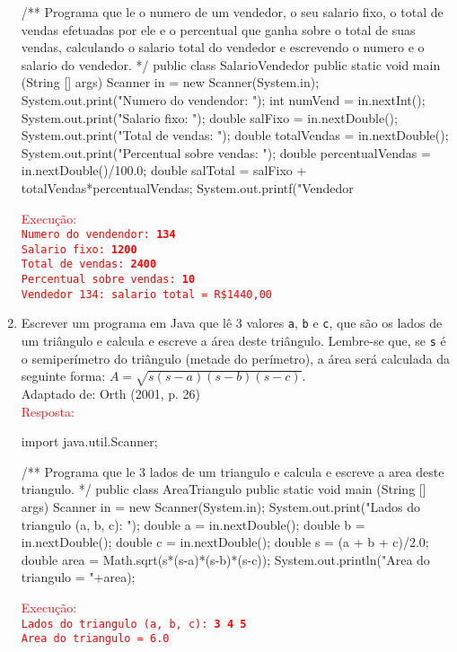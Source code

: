 \documentclass[onecolumn,a4paper,10pt]{report}
\newcommand{\+}{\, + \,}
\newcommand{\<}{\hspace*{-0.4cm}}
\begin{document}
\begin{enumerate}[1.]
\begin{javacode}
/**
   Programa que le o numero de um vendedor, o seu salario fixo, o total de
   vendas efetuadas por ele e o percentual que ganha sobre o total de suas
   vendas, calculando o salario total do vendedor e escrevendo o numero e o
   salario do vendedor.
*/
public class SalarioVendedor {
    public static void main (String [] args) {
        Scanner in = new Scanner(System.in);
        System.out.print("Numero do vendendor: ");
        int numVend = in.nextInt();
        System.out.print("Salario fixo: ");
        double salFixo = in.nextDouble();
        System.out.print("Total de vendas: ");
        double totalVendas = in.nextDouble();
        System.out.print("Percentual sobre vendas: ");
        double percentualVendas = in.nextDouble()/100.0;
        double salTotal = salFixo + totalVendas*percentualVendas;
        System.out.printf("Vendedor %
    }
}
\end{javacode}
\textcolor{red}{Execução:\\
\texttt{Numero do vendendor: \textbf{134}\\
Salario fixo: \textbf{1200}\\
Total de vendas: \textbf{2400}\\
Percentual sobre vendas: \textbf{10}\\
Vendedor 134: salario total = R\$1440,00}
}

\item Escrever um programa em Java que lê 3 valores \texttt{a}, \texttt{b} e \texttt{c}, que são os lados de um triângulo e calcula e escreve a área deste triângulo. Lembre-se que, se \texttt{s} é o semiperímetro do triângulo (metade do perímetro), a área será calculada da seguinte forma: $A = \sqrt{s(s-a)(s-b)(s-c)}$.\\
{\tiny Adaptado de: Orth (2001, p. 26)}\\
\textcolor{red}{Resposta:}\\
\begin{javacode}
import java.util.Scanner;

/**
   Programa que le 3 lados de um triangulo e calcula e escreve
   a area deste triangulo.
*/
public class AreaTriangulo {
    public static void main (String [] args) {
        Scanner in = new Scanner(System.in);
        System.out.print("Lados do triangulo (a, b, c): ");
        double a = in.nextDouble();
        double b = in.nextDouble();
        double c = in.nextDouble();
        double s = (a + b + c)/2.0;
        double area = Math.sqrt(s*(s-a)*(s-b)*(s-c));
        System.out.println("Area do triangulo = "+area);
    }
}
\end{javacode}
\textcolor{red}{Execução:\\
\texttt{Lados do triangulo (a, b, c): \textbf{3 4 5}\\
Area do triangulo = 6.0}
}


\end{enumerate}
\end{document}
